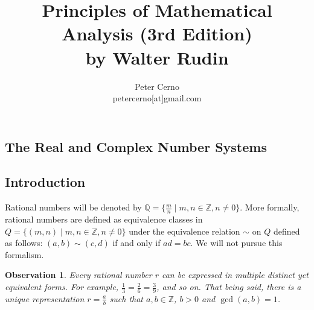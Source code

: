 \documentclass[10pt,varwidth=6in,margin=0.2in,preview]{standalone}
\title{
    Principles of Mathematical Analysis (3rd Edition)\\
    by Walter Rudin
}
\author{
    Peter Cerno\\
    \small petercerno[at]gmail.com
}
\newtheorem*{_observation}{Observation}
\begin{document}
\begin{flushleft}

\pagecolor{pagecolor}


\setcounter{section}{0}
\section{The Real and Complex Number Systems}

\setcounter{subsection}{0}
\subsection*{Introduction}

Rational numbers will be denoted by $\mathbb{Q} = \{ \frac{m}{n} \mid m, n \in \mathbb{Z}, n \neq 0 \}$.
More formally, rational numbers are defined as equivalence classes in $Q = \{ (m, n) \mid m, n \in \mathbb{Z}, n \neq 0 \}$ under the equivalence relation $\sim$ on $Q$ defined as follows: $(a, b) \sim (c, d)$ if and only if $a d = b c$. We will not pursue this formalism.

\begin{_observation}
Every rational number $r$ can be expressed in multiple distinct yet equivalent forms.
For example, $\frac{1}{3} = \frac{2}{6} = \frac{3}{9}$, and so on. That being said, there is a unique representation $r = \frac{a}{b}$ such that $a, b \in \mathbb{Z}$, $b > 0$ and $\gcd(a, b) = 1$.
\end{_observation}


\end{flushleft}
\end{document}
